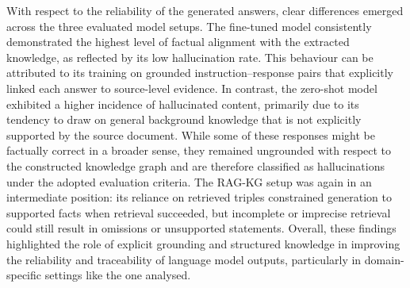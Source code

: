 With respect to the reliability of the generated answers, clear differences emerged across the three evaluated model setups. The fine-tuned model consistently demonstrated the highest level of factual alignment with the extracted knowledge, as reflected by its low hallucination rate. This behaviour can be attributed to its training on grounded instruction–response pairs that explicitly linked each answer to source-level evidence. In contrast, the zero-shot model exhibited a higher incidence of hallucinated content, primarily due to its tendency to draw on general background knowledge that is not explicitly supported by the source document. While some of these responses might be factually correct in a broader sense, they remained ungrounded with respect to the constructed knowledge graph and are therefore classified as hallucinations under the adopted evaluation criteria. The RAG-KG setup was again in an intermediate position: its reliance on retrieved triples constrained generation to supported facts when retrieval succeeded, but incomplete or imprecise retrieval could still result in omissions or unsupported statements. Overall, these findings highlighted the role of explicit grounding and structured knowledge in improving the reliability and traceability of language model outputs, particularly in domain-specific settings like the one analysed. 